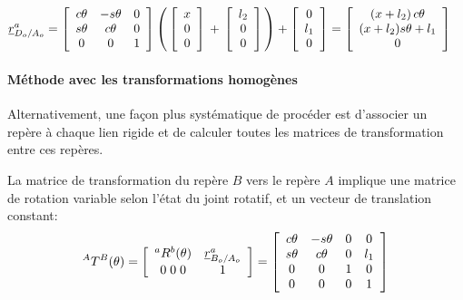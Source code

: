 \begin{align}
	\underline{r}_{D_o/A_o}^a &=  \left[ \begin{array}{c c c}
									   c\theta & -s\theta & 0 \\
									   s\theta & c\theta & 0 \\
									   0 & 0 & 1
	\end{array}  \right] \left( \, \left[ \begin{array}{c}
											  x \\ 0 \\ 0
	\end{array} \right]  \, + \, \left[ \begin{array}{c}
											l_2 \\ 0 \\ 0
	\end{array} \right]   \,  \right) + \left[ \begin{array}{c}
												   0 \\ l_1 \\ 0
	\end{array} \right] =
	\left[ \begin{array}{c}
			   ( x + l_2 ) \, c\theta \\ ( x + l_2 ) s\theta  + l_1 \\ 0
	\end{array} \right]
\end{align}




\paragraph{Méthode avec les transformations homogènes}

Alternativement, une façon plus systématique de procéder est d'associer un repère à chaque lien rigide et de calculer toutes les matrices de transformation entre ces repères.

La matrice de transformation du repère $B$ vers le repère $A$ implique une matrice de rotation variable selon l'état du joint rotatif, et un vecteur de translation constant:
\begin{align}
	^AT^B(\theta)
	=
	\left[ \begin{array}{c c }
			   ^aR^b(\theta)  & \underline{r}_{B_o/A_o}^a \\ 0 \; 0 \; 0 & 1
	\end{array} \right]  =
	\left[ \begin{array}{c c c c}
			   c\theta & -s\theta & 0 & 0  \\
			   s\theta & c\theta  & 0 & l_1  \\
			   0 & 0 & 1              & 0  \\
			   0 & 0 & 0              & 1
	\end{array} \right]
\end{align}

